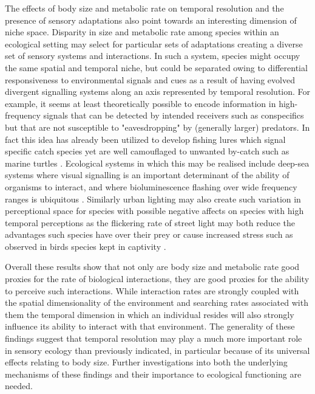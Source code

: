 The effects of body size and metabolic rate on temporal resolution and the presence of sensory adaptations also point towards an interesting dimension of niche space. Disparity in size and metabolic rate among species within an ecological setting may select for particular sets of adaptations creating a diverse set of sensory systems and interactions. In such a system, species might occupy the same spatial and temporal niche,
 but could be separated owing to differential responsiveness to environmental signals and cues as a result of having evolved divergent signalling systems along an axis represented by temporal resolution. For example, it seems at least theoretically possible to encode information in high-frequency signals that can be detected by intended receivers such as conspecifics but that are not susceptible to "eavesdropping" by (generally larger) predators. In fact this idea has already been utilized to develop fishing lures which signal specific catch species yet are well camouflaged to unwanted by-catch such as marine turtles \citep{jordan2013linking,crognale2008leatherback}. Ecological systems in which this may be realised include deep-sea systems where visual signalling is an important determinant of the ability of organisms to interact, and where bioluminescence flashing over wide frequency ranges is ubiquitous \citep{haddock2005bioluminescent,widder2010bioluminescence}. Similarly urban lighting may also create such variation in perceptional space for species with possible negative affects on species with high temporal perceptions as the flickering rate of street light may both reduce the advantages such species have over their prey or cause increased stress such as observed in birds species kept in captivity \citep{inger2014potential}. 


Overall these results show that not only are body size and metabolic rate good proxies for the rate of biological interactions, they are good proxies for the ability to perceive such interactions. While interaction rates are strongly coupled with the spatial dimensionality of the environment and searching rates associated with them \citep{pawar2012dimensionality} the temporal dimension in which an individual resides will also strongly influence its ability to interact with that environment. The generality of these findings suggest that temporal resolution may play a much more important role in sensory ecology than previously indicated, in particular because of its universal effects relating to body size. Further investigations into both the underlying mechanisms of these findings and their importance to ecological functioning are needed.


%
%


